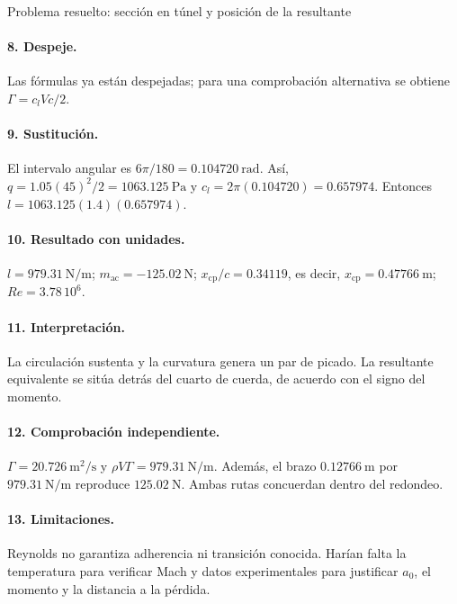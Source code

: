 \begin{studiumworked}{Problema resuelto: sección en túnel y posición de la resultante}
\paragraph{8. Despeje.} Las fórmulas ya están despejadas; para una comprobación alternativa se obtiene $\Gamma=c_lVc/2$.
\paragraph{9. Sustitución.} El intervalo angular es $6\pi/180=0.104720\ \mathrm{rad}$. Así, $q=1.05(45)^2/2=1063.125\ \mathrm{Pa}$ y $c_l=2\pi(0.104720)=0.657974$. Entonces $l=1063.125(1.4)(0.657974)$.
\paragraph{10. Resultado con unidades.} $l=979.31\ \mathrm{N/m}$; $m_{\mathrm{ac}}=-125.02\ \mathrm{N}$; $x_{\mathrm{cp}}/c=0.34119$, es decir, $x_{\mathrm{cp}}=0.47766\ \mathrm m$; $Re=3.78\,10^6$.
\paragraph{11. Interpretación.} La circulación sustenta y la curvatura genera un par de picado. La resultante equivalente se sitúa detrás del cuarto de cuerda, de acuerdo con el signo del momento.
\paragraph{12. Comprobación independiente.} $\Gamma=20.726\ \mathrm{m^2/s}$ y $\rho V\Gamma=979.31\ \mathrm{N/m}$. Además, el brazo $0.12766\ \mathrm m$ por $979.31\ \mathrm{N/m}$ reproduce $125.02\ \mathrm N$. Ambas rutas concuerdan dentro del redondeo.
\paragraph{13. Limitaciones.} Reynolds no garantiza adherencia ni transición conocida. Harían falta la temperatura para verificar Mach y datos experimentales para justificar $a_0$, el momento y la distancia a la pérdida.




\end{studiumworked}
